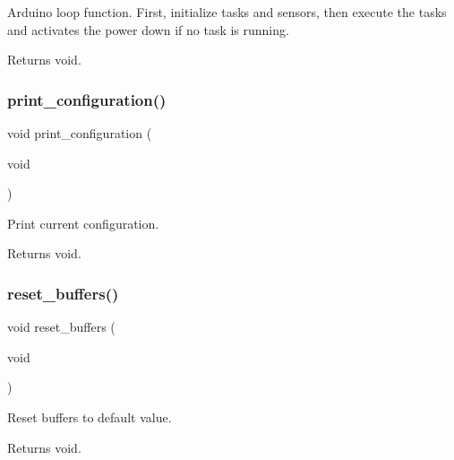 Arduino loop function. First, initialize tasks and sensors, then execute the tasks and activates the power down if no task is running. 

\begin{DoxyReturn}{Returns}
void. 
\end{DoxyReturn}
\mbox{\label{i2c-rain_8ino_a65b2dadc0411e43874ec8ed7f73bc62a}} 
\subsubsection{\texorpdfstring{print\+\_\+configuration()}{print\_configuration()}}
{\footnotesize\ttfamily void print\+\_\+configuration (\begin{DoxyParamCaption}\item[{void}]{ }\end{DoxyParamCaption})}



Print current configuration. 

\begin{DoxyReturn}{Returns}
void. 
\end{DoxyReturn}
\mbox{\label{i2c-rain_8ino_a07daf3835b622d4d3451690f603845c1}} 
\subsubsection{\texorpdfstring{reset\+\_\+buffers()}{reset\_buffers()}}
{\footnotesize\ttfamily void reset\+\_\+buffers (\begin{DoxyParamCaption}\item[{void}]{ }\end{DoxyParamCaption})}



Reset buffers to default value. 

\begin{DoxyReturn}{Returns}
void. 
\end{DoxyReturn}
\mbox{\label{i2c-rain_8ino_afa979a8cb238fe81bf20654dfd6096ef}} 
